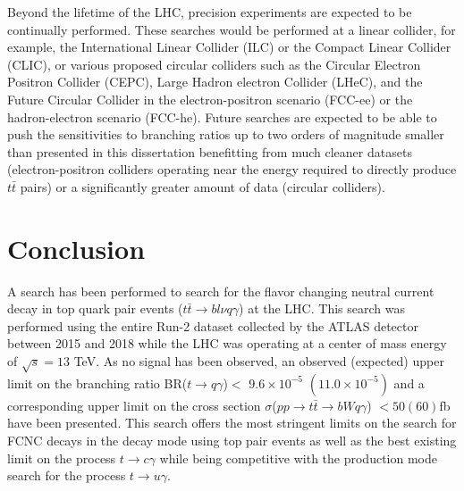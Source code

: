 Beyond the lifetime of the LHC, precision experiments are expected to be continually performed.  These searches would be performed at a linear collider, for example, the International Linear Collider (ILC)\cite{Buesser:2013pza} or the Compact Linear Collider (CLIC)\cite{Zarnecki:2018lup}, or various proposed circular colliders such as the Circular Electron Positron Collider (CEPC)\cite{CEPC-SPPCStudyGroup:2015csa}, Large Hadron electron Collider (LHeC)\cite{Bruning:2652313},  and the Future Circular Collider in the electron-positron scenario (FCC-ee) or the hadron-electron scenario (FCC-he)\cite{Benedikt:2015kqj}.   Future searches are expected to be able to push the sensitivities to branching ratios up to two orders of magnitude smaller than presented in this dissertation\cite{Cakir:2018ruj} benefitting from much cleaner datasets (electron-positron colliders operating near the energy required to directly produce $t\bar{t}$ pairs) or a significantly greater amount of data (circular colliders).

\section{Conclusion}

A search has been performed to search for the flavor changing neutral current decay in top quark pair events ($t\bar{t}\rightarrow bl\nu q \gamma$) at the LHC.  This search was performed using the entire Run-2 dataset collected by the ATLAS detector between 2015 and 2018 while the LHC was operating at a center of mass energy of $\sqrt{s}=13$ TeV.  As no signal has been observed, an observed (expected) upper limit on the branching ratio BR($t\rightarrow q \gamma$)$<$ $9.6\times10^{-5}$ $(11.0\times10^{-5})$ and a corresponding upper limit on the cross section $\sigma$($pp\rightarrow t\bar{t} \rightarrow bWq\gamma$) $< 50 (60)$fb have been presented.  This search offers the most stringent limits on the search for FCNC decays in the decay mode using top pair events as well as the best existing limit on the process $t\rightarrow c \gamma$ while being competitive with the production mode search for the process $t\rightarrow u \gamma$.

